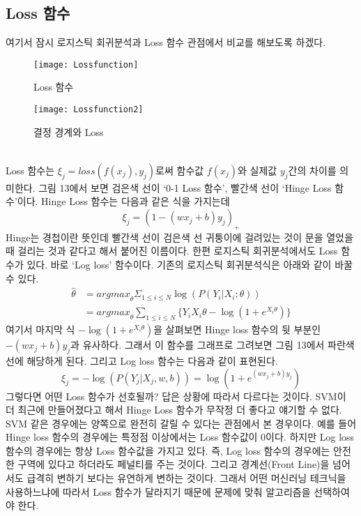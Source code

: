 \documentclass[a4paper]{oblivoir}
\begin{document}
\subsection{Loss 함수}
\indent 여기서 잠시 로지스틱 회귀분석과 Loss 함수 관점에서 비교를 해보도록 하겠다. \\
\begin{figure}[ht]\centering
\parbox[t]{5cm}{\texttt{[image: Lossfunction]}\caption{Loss 함수}\label{Fig:5-13}}\hspace{1cm}
\parbox[t]{5cm}{\texttt{[image: Lossfunction2]}\caption{결정 경계와 Loss}\label{Fig:5-14}}
\end{figure}\\
\indent Loss 함수는 $\xi_j=loss(f(x_j),y_j)$로써 함수값 $f(x_j)$와 실제값 $y_j$간의 차이를 의미한다. 그림 13에서 보면 검은색 선이 `0-1 Loss 함수', 빨간색 선이 `Hinge Loss 함수'이다. Hinge Loss 함수는 다음과 같은 식을 가지는데
\begin{equation}
\xi_j=(1-(wx_j+b)y_j)_{+}
\label{eq:5-16}
\end{equation}
Hinge는 경첩이란 뜻인데 빨간색 선이 검은색 선 귀퉁이에 걸려있는 것이 문을 열었을 때 걸리는 것과 같다고 해서 붙어진 이름이다. 한편 로지스틱 회귀분석에서도 Loss 함수가 있다. 바로 `Log loss' 함수이다. 기존의 로지스틱 회귀분석식은 아래와 같이 바꿀 수 있다.
\begin{equation}
\begin{split}
\hat{\theta}&={argmax}_{\theta}\Sigma_{1\leq i\leq N} \log(P(Y_i|X_i;\theta))\\
&={argmax}_{\theta} \sum_{1\leq i\leq N}\{Y_i X_i \theta - \log(1+e^{X_i \theta})\}
\end{split}
\end{equation}
\indent 여기서 마지막 식 $- \log(1+e^{X_i \theta})$을 살펴보면 Hinge loss 함수의 뒷 부분인 $-(wx_j+b)y_j$과 유사하다. 그래서 이 함수를 그래프로 그려보면 그림 13에서 파란색 선에 해당하게 된다. 그리고 Log loss 함수는 다음과 같이 표현된다.
\begin{equation}
\xi_j=-\log(P(Y_j|X_j,w,b))=\log(1+e^{(wx_j+b)y_j})
\label{eq:5-17}
\end{equation}
\indent 그렇다면 어떤 Loss 함수가 선호될까? 답은 상황에 따라서 다르다는 것이다. SVM이 더 최근에 만들어졌다고 해서 Hinge Loss 함수가 무작정 더 좋다고 얘기할 수 없다. SVM 같은 경우에는 양쪽으로 완전히 갈릴 수 있다는 관점에서 본 경우이다. 예를 들어 Hinge loss 함수의 경우에는 특정점 이상에서는 Loss 함수값이 0이다. 하지만 Log loss 함수의 경우에는 항상 Loss 함수값을 가지고 있다. 즉, Log loss 함수의 경우에는 안전한 구역에 있다고 하더라도 페널티를 주는 것이다. 그리고 경계선(Front Line)을 넘어서도 급격히 변하기 보다는 유연하게 변하는 것이다. 그래서 어떤 머신러닝 테크닉을 사용하느냐에 따라서 Loss 함수가 달라지기 때문에 문제에 맞춰 알고리즘을 선택하여야 한다.\\
\end{document}
